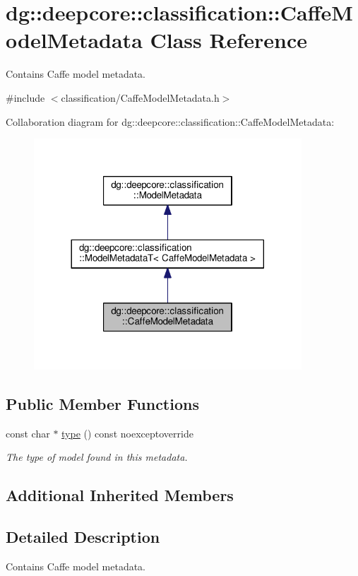 \hypertarget{structdg_1_1deepcore_1_1classification_1_1_caffe_model_metadata}{}\section{dg\+:\+:deepcore\+:\+:classification\+:\+:Caffe\+Model\+Metadata Class Reference}
\label{structdg_1_1deepcore_1_1classification_1_1_caffe_model_metadata}


Contains Caffe model metadata.  




{\ttfamily \#include $<$classification/\+Caffe\+Model\+Metadata.\+h$>$}



Collaboration diagram for dg\+:\+:deepcore\+:\+:classification\+:\+:Caffe\+Model\+Metadata\+:
\nopagebreak
\begin{figure}[H]
\begin{center}
\leavevmode
\includegraphics[width=284pt]{structdg_1_1deepcore_1_1classification_1_1_caffe_model_metadata__coll__graph}
\end{center}
\end{figure}
\subsection*{Public Member Functions}
\begin{DoxyCompactItemize}
\item 
const char $\ast$ \hyperlink{group___classification_module_ga8681b7b38c886f71e1f680501088cf89}{type} () const noexceptoverride
\begin{DoxyCompactList}\small\item\em The type of model found in this metadata. \end{DoxyCompactList}\end{DoxyCompactItemize}
\subsection*{Additional Inherited Members}


\subsection{Detailed Description}
Contains Caffe model metadata. 